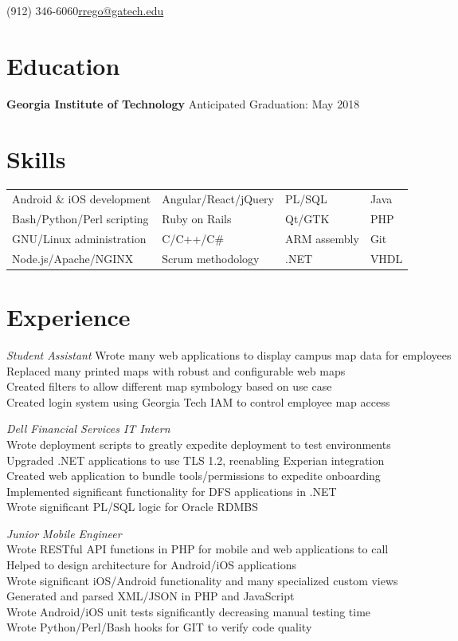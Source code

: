 \documentclass[line, margin]{resume}
\begin{document}

 {(912) 346-6060}{\href{mailto:rrego@gatech.edu}{rrego@gatech.edu}}

\section{Education}
\textbf{Georgia Institute of Technology} \hfill Anticipated Graduation: May 2018 
\section{Skills}
\begin{tabular}{l l l l} Android \& iOS development & Angular/React/jQuery & PL/SQL & Java \\
	Bash/Python/Perl scripting & Ruby on Rails & Qt/GTK & PHP \\
	GNU/Linux administration & C/C++/C\# & ARM assembly & Git \\
	Node.js/Apache/NGINX & Scrum methodology & .NET & VHDL
\end{tabular}
\section{Experience}
\textit{Student Assistant}
Wrote many web applications to display campus map data for employees\\
Replaced many printed maps with robust and configurable web maps\\
Created filters to allow different map symbology based on use case\\
Created login system using Georgia Tech IAM to control employee map access

\textit{Dell Financial Services IT Intern} \\
Wrote deployment scripts to greatly expedite deployment to test environments \\
Upgraded .NET applications to use TLS 1.2, reenabling Experian integration \\
Created web application to bundle tools/permissions to expedite onboarding \\
Implemented significant functionality for DFS applications in .NET \\
Wrote significant PL/SQL logic for Oracle RDMBS

\textit{Junior Mobile Engineer} \\
Wrote RESTful API functions in PHP for mobile and web applications to call \\
Helped to design architecture for Android/iOS applications \\
Wrote significant iOS/Android functionality and many specialized custom views \\
Generated and parsed XML/JSON in PHP and JavaScript \\
Wrote Android/iOS unit tests significantly decreasing manual testing time \\
Wrote Python/Perl/Bash hooks for GIT to verify code quality
\end{document}
